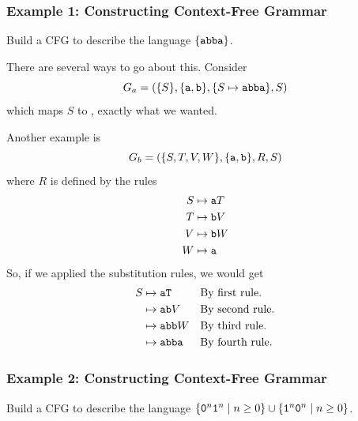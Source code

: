 \documentclass[letterpaper]{article}
\begin{document}
\subsubsection{Example 1: Constructing Context-Free Grammar}
Build a CFG to describe the language $\{\texttt{abba}\}$. 

\begin{mdframed}[]
    There are several ways to go about this. Consider
    \[G_a = (\{S\}, \{\texttt{a}, \texttt{b}\}, \{S \mapsto \texttt{abba}\}, S)\]
    which maps $S$ to , exactly what we wanted. 

    \bigskip 

    Another example is 
    \[G_b = (\{S, T, V, W\}, \{\texttt{a}, \texttt{b}\}, R, S)\]
    where $R$ is defined by the rules 
    \begin{equation*}
        \begin{aligned}
            S &\mapsto \texttt{a}T \\ 
            T &\mapsto \texttt{b}V \\ 
            V &\mapsto \texttt{b}W \\ 
            W &\mapsto \texttt{a}
        \end{aligned}
    \end{equation*}
    So, if we applied the substitution rules, we would get 
    \begin{equation*}
        \begin{aligned}
            S &\mapsto \texttt{aT} && \text{By first rule.} \\ 
                &\mapsto \texttt{ab}V && \text{By second rule.} \\ 
                &\mapsto \texttt{abb}W && \text{By third rule.} \\ 
                &\mapsto \texttt{abba} && \text{By fourth rule.}
        \end{aligned}
    \end{equation*}
\end{mdframed}

\subsubsection{Example 2: Constructing Context-Free Grammar}
Build a CFG to describe the language $\{\texttt{0}^n \texttt{1}^n \mid n \geq 0\} \cup \{\texttt{1}^n \texttt{0}^n \mid n \geq 0\}$. 
\end{document}
